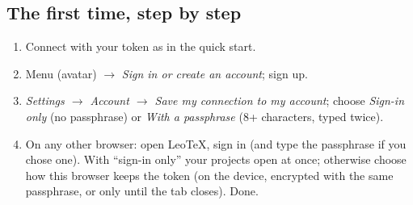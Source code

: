 \documentclass[11pt,a4paper]{article}
\newcommand{\leotex}{Leo\TeX{}}
\begin{document}
\subsection{The first time, step by step}
\begin{enumerate}
  \item Connect with your token as in the quick start.
  \item Menu (avatar) $\rightarrow$ \emph{Sign in or create an account}; sign up.
  \item \emph{Settings $\rightarrow$ Account $\rightarrow$ Save my connection to my account}; choose \emph{Sign-in only} (no passphrase) or \emph{With a passphrase} (8+ characters, typed twice).
  \item On any other browser: open \leotex{}, sign in (and type the passphrase if you chose one). With ``sign-in only'' your projects open at once; otherwise choose how this browser keeps the token (on the device, encrypted with
        the same passphrase, or only until the tab closes). Done.
\end{enumerate}
\end{document}
